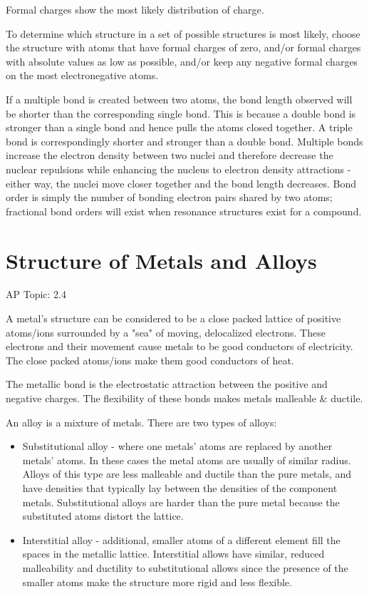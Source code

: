 \documentclass[../chem.tex]{subfiles}
\begin{document}
Formal charges show the most likely distribution of charge. 

To determine which structure in a set of possible structures is most likely, choose the structure with atoms that have formal charges of zero,
and/or formal charges with absolute values as low as possible, and/or keep any negative formal charges on the most electronegative atoms.

If a multiple bond is created between two atoms, the bond length observed will be shorter than the corresponding single bond. This is because a double 
bond is stronger than a single bond and hence pulls the atoms closed together. A triple bond is correspondingly shorter and stronger than a double bond. 
Multiple bonds increase the electron density between two nuclei and therefore decrease the nuclear repulsions while enhancing the nucleus to electron 
density attractions - either way, the nuclei move closer together and the bond length decreases. Bond order is simply the number of bonding electron pairs 
shared by two atoms; fractional bond orders will exist when resonance structures exist for a compound.
\section{Structure of Metals and Alloys}
AP Topic: 2.4

A metal's structure can be considered to be a close packed lattice of positive atoms/ions surrounded by a "sea" of moving, delocalized electrons. 
These electrons and their movement cause metals to be good conductors of electricity. The close packed atoms/ions make them good conductors of heat.

The metallic bond is the electrostatic attraction between the positive and negative charges. The flexibility of these bonds makes metals malleable \& ductile.

An alloy is a mixture of metals. There are two types of alloys:
\begin{itemize}
    \item Substitutional alloy - where one metals' atoms are replaced by another metals' atoms. In these cases the metal atoms are usually of similar 
    radius. Alloys of this type are less malleable and ductile than the pure metals, and have densities that typically lay between the densities of the component metals.
    Substitutional alloys are harder than the pure metal because the substituted atoms distort the lattice.
    \item Interstitial alloy - additional, smaller atoms of a different element fill the spaces in the metallic lattice. Interstitial allows 
    have similar, reduced malleability and ductility to substitutional allows since the presence of the smaller atoms make the structure more rigid and less flexible.
\end{itemize}
\end{document}
